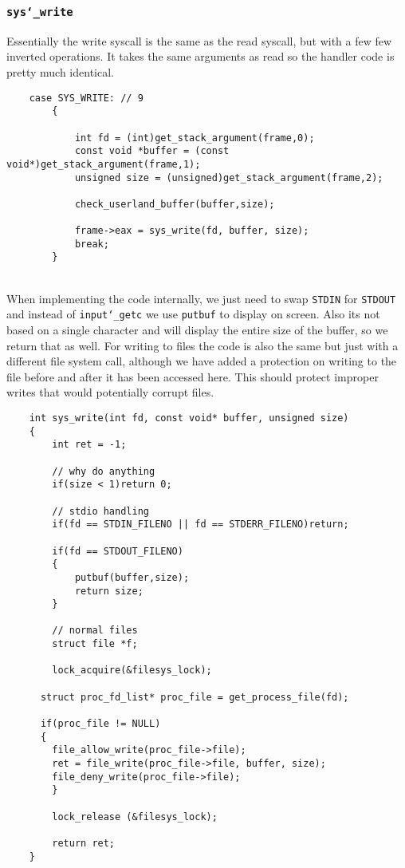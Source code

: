 \documentclass[]{article}
\begin{document}
		   
		   \newpage
  \subsubsection{\texttt{sys\char`_write}}
  
  Essentially the write syscall is the same as the read syscall, but with a few few inverted operations. It takes the same arguments as read so the handler code is pretty much identical.
  			\lstset{language=C, tabsize=2}  
		    \begin{lstlisting}   
	case SYS_WRITE: // 9
		{
		
			int fd = (int)get_stack_argument(frame,0);
			const void *buffer = (const void*)get_stack_argument(frame,1);
			unsigned size = (unsigned)get_stack_argument(frame,2);

			check_userland_buffer(buffer,size);
			
			frame->eax = sys_write(fd, buffer, size);
			break;
		}
		   \end{lstlisting}	
  \newpage
  \textbf{}\\
  When implementing the code internally, we just need to swap \texttt{STDIN} for \texttt{STDOUT} and  instead of \texttt{input\char`_getc} we use \texttt{putbuf} to display on screen. Also its not based on a single character and will display the entire size of the buffer, so we return that as well. For writing to files the code is also the same but just with a different file system call, although we have added a protection on writing to the file before and after it has been accessed here. This should protect improper writes that would potentially corrupt files.\\
			\lstset{language=C, tabsize=2}  
		    \begin{lstlisting}   
	int sys_write(int fd, const void* buffer, unsigned size)
	{
		int ret = -1;
		
		// why do anything
		if(size < 1)return 0;

		// stdio handling
		if(fd == STDIN_FILENO || fd == STDERR_FILENO)return;
		
		if(fd == STDOUT_FILENO)
		{
			putbuf(buffer,size);
			return size;
		}

		// normal files		
		struct file *f;

		lock_acquire(&filesys_lock);
	
	  struct proc_fd_list* proc_file = get_process_file(fd);
	  
	  if(proc_file != NULL)
	  {
	  	file_allow_write(proc_file->file);
	  	ret = file_write(proc_file->file, buffer, size);
	  	file_deny_write(proc_file->file);
		}
		
		lock_release (&filesys_lock);

		return ret;
	}
		   \end{lstlisting}	  
		   \newpage
		   
\end{document}
